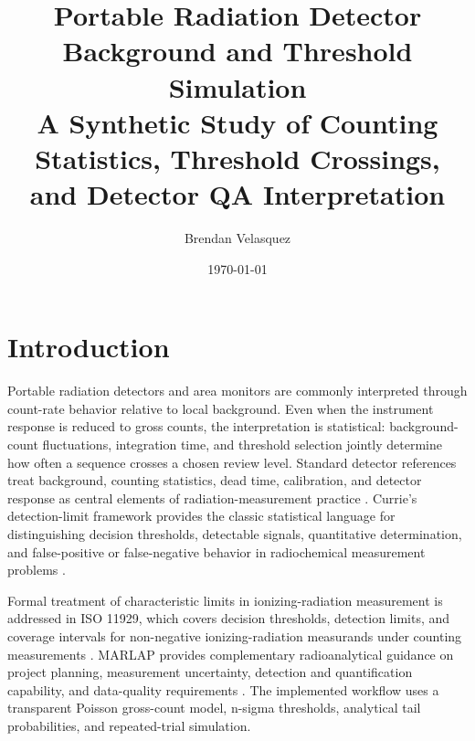 \documentclass[11pt,twocolumn]{article}
\title{Portable Radiation Detector Background and Threshold Simulation\\[0.25em]
\large A Synthetic Study of Counting Statistics, Threshold Crossings, and Detector QA Interpretation}
\author{Brendan Velasquez}
\date{\today}
\begin{document}

\section{Introduction}

Portable radiation detectors and area monitors are commonly interpreted through count-rate behavior relative to local background. Even when the instrument response is reduced to gross counts, the interpretation is statistical: background-count fluctuations, integration time, and threshold selection jointly determine how often a sequence crosses a chosen review level. Standard detector references treat background, counting statistics, dead time, calibration, and detector response as central elements of radiation-measurement practice \cite{Knoll2010}. Currie's detection-limit framework provides the classic statistical language for distinguishing decision thresholds, detectable signals, quantitative determination, and false-positive or false-negative behavior in radiochemical measurement problems \cite{Currie1968}.

Formal treatment of characteristic limits in ionizing-radiation measurement is addressed in ISO 11929, which covers decision thresholds, detection limits, and coverage intervals for non-negative ionizing-radiation measurands under counting measurements \cite{ISO11929}. MARLAP provides complementary radioanalytical guidance on project planning, measurement uncertainty, detection and quantification capability, and data-quality requirements \cite{MARLAP2004}. The implemented workflow uses a transparent Poisson gross-count model, n-sigma thresholds, analytical tail probabilities, and repeated-trial simulation.
\end{document}
